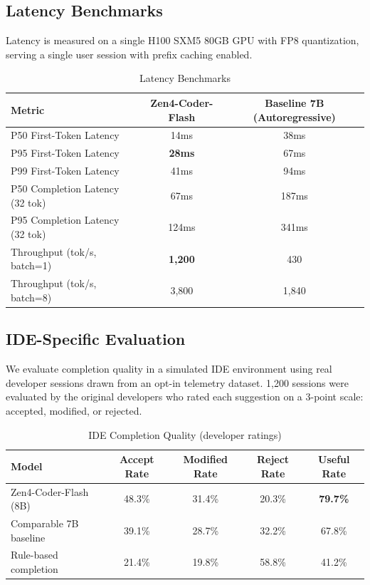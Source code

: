 \documentclass[11pt,a4paper]{article}
\begin{document}
\subsection{Latency Benchmarks}

Latency is measured on a single H100 SXM5 80GB GPU with FP8 quantization, serving a single user session with prefix caching enabled.

\begin{table}[H]
\centering
\caption{Latency Benchmarks}
\begin{tabular}{lcc}
\toprule
\textbf{Metric} & \textbf{Zen4-Coder-Flash} & \textbf{Baseline 7B (Autoregressive)} \\
\midrule
P50 First-Token Latency & 14ms & 38ms \\
P95 First-Token Latency & \textbf{28ms} & 67ms \\
P99 First-Token Latency & 41ms & 94ms \\
P50 Completion Latency (32 tok) & 67ms & 187ms \\
P95 Completion Latency (32 tok) & 124ms & 341ms \\
Throughput (tok/s, batch=1) & \textbf{1,200} & 430 \\
Throughput (tok/s, batch=8) & 3,800 & 1,840 \\
\bottomrule
\end{tabular}
\end{table}

\subsection{IDE-Specific Evaluation}

We evaluate completion quality in a simulated IDE environment using real developer sessions drawn from an opt-in telemetry dataset. 1,200 sessions were evaluated by the original developers who rated each suggestion on a 3-point scale: accepted, modified, or rejected.

\begin{table}[H]
\centering
\caption{IDE Completion Quality (developer ratings)}
\begin{tabular}{lcccc}
\toprule
\textbf{Model} & \textbf{Accept Rate} & \textbf{Modified Rate} & \textbf{Reject Rate} & \textbf{Useful Rate} \\
\midrule
Zen4-Coder-Flash (8B) & 48.3\% & 31.4\% & 20.3\% & \textbf{79.7\%} \\
Comparable 7B baseline & 39.1\% & 28.7\% & 32.2\% & 67.8\% \\
Rule-based completion & 21.4\% & 19.8\% & 58.8\% & 41.2\% \\
\bottomrule
\end{tabular}
\end{table}
\end{document}
